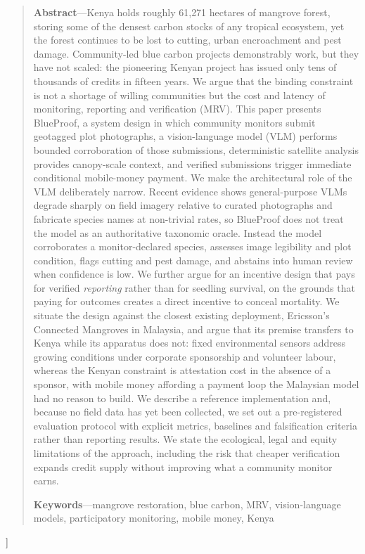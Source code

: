 \documentclass[10pt,twocolumn,a4paper]{article}
\begin{document}
\begin{@twocolumnfalse}
\begin{quote}
\small
\noindent\textbf{Abstract}---Kenya holds roughly 61{,}271 hectares of mangrove
forest, storing some of the densest carbon stocks of any tropical ecosystem, yet
the forest continues to be lost to cutting, urban encroachment and pest damage.
Community-led blue carbon projects demonstrably work, but they have not scaled:
the pioneering Kenyan project has issued only tens of thousands of credits in
fifteen years. We argue that the binding constraint is not a shortage of willing
communities but the cost and latency of monitoring, reporting and verification
(MRV). This paper presents BlueProof, a system design in which community
monitors submit geotagged plot photographs, a vision-language model (VLM)
performs bounded corroboration of those submissions, deterministic satellite
analysis provides canopy-scale context, and verified submissions trigger
immediate conditional mobile-money payment. We make the architectural role of
the VLM deliberately narrow. Recent evidence shows general-purpose VLMs degrade
sharply on field imagery relative to curated photographs and fabricate species
names at non-trivial rates, so BlueProof does not treat the model as an
authoritative taxonomic oracle. Instead the model corroborates a
monitor-declared species, assesses image legibility and plot condition, flags
cutting and pest damage, and abstains into human review when confidence is low.
We further argue for an incentive design that pays for verified \emph{reporting}
rather than for seedling survival, on the grounds that paying for outcomes
creates a direct incentive to conceal mortality. We situate the design against
the closest existing deployment, Ericsson's Connected Mangroves in Malaysia,
and argue that its premise transfers to Kenya while its apparatus does not:
fixed environmental sensors address growing conditions under corporate
sponsorship and volunteer labour, whereas the Kenyan constraint is attestation
cost in the absence of a sponsor, with mobile money affording a payment loop the
Malaysian model had no reason to build. We describe a reference
implementation and, because no field data has yet been collected, we set out a
pre-registered evaluation protocol with explicit metrics, baselines and
falsification criteria rather than reporting results. We state the ecological,
legal and equity limitations of the approach, including the risk that cheaper
verification expands credit supply without improving what a community monitor
earns.
\vspace{6pt}

\noindent\textbf{Keywords}---mangrove restoration, blue carbon, MRV,
vision-language models, participatory monitoring, mobile money, Kenya
\end{quote}
\vspace{12pt}
\end{@twocolumnfalse}
]
\end{document}
